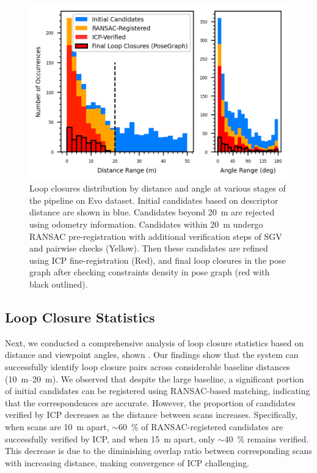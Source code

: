\begin{figure}[t]
  \centering
  \includegraphics[width=0.99\columnwidth]{pics/exp_2_2_loop_closure_histograms}
  \caption{Loop closures distribution by distance and angle at various stages of the pipeline on Evo dataset.
   Initial candidates based on descriptor distance are shown in blue. Candidates beyond \SI{20}{\meter} are rejected using odometry information. Candidates within \SI{20}{\meter} undergo RANSAC pre-registration with additional verification steps of SGV\cite{vidanapathirana2023ral} and pairwise checks (Yellow). Then these candidates are refined using ICP fine-registration (Red), and final loop closures in the pose graph after checking constraints density in pose graph (red with black outlined).}
  \label{fig:exp_2_2_loop_closure_histograms}
\end{figure}
\subsection{Loop Closure Statistics}
Next, we conducted a comprehensive analysis of loop closure statistics based on distance and viewpoint angles, shown . Our findings show that the system can successfully identify loop closure pairs across considerable baseline distances (\SIrange{10}{20}{\meter}). We observed that despite the large baseline, a significant portion of initial candidates can be registered using RANSAC-based matching, indicating that the correspondences are accurate. However, the proportion of candidates verified by ICP decreases as the distance between scans increases. Specifically, when scans are \SI{10}{\meter} apart, $\sim$\SI{60}{\percent} of RANSAC-registered candidates are successfully verified by ICP, and when \SI{15}{\meter} apart, only $\sim$\SI{40}{\percent} remains verified. This decrease is due to the diminishing overlap ratio between corresponding scans with increasing distance, making convergence of ICP challenging.

